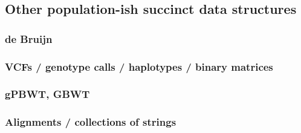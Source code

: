 \subsection{Other population-ish succinct data structures}

\subsubsection{de Bruijn}


\subsubsection{VCFs / genotype calls / haplotypes / binary matrices}

\subsubsection{gPBWT, GBWT}



\subsubsection{Alignments / collections of strings}

